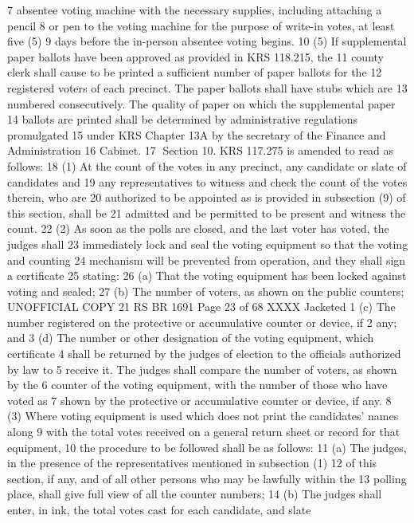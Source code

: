 7 absentee voting machine with the necessary supplies, including attaching a pencil
8 or pen to the voting machine for the purpose of write-in votes, at least five (5)
9 days before the in-person absentee voting begins.
10 (5) If supplemental paper ballots have been approved as provided in KRS 118.215, the
11 county clerk shall cause to be printed a sufficient number of paper ballots for the
12 registered voters of each precinct. The paper ballots shall have stubs which are
13 numbered consecutively. The quality of paper on which the supplemental paper
14 ballots are printed shall be determined by administrative regulations promulgated
15 under KRS Chapter 13A by the secretary of the Finance and Administration
16 Cabinet.
17 Section 10. KRS 117.275 is amended to read as follows:
18 (1) At the count of the votes in any precinct, any candidate or slate of candidates and
19 any representatives to witness and check the count of the votes therein, who are
20 authorized to be appointed as is provided in subsection (9) of this section, shall be
21 admitted and be permitted to be present and witness the count.
22 (2) As soon as the polls are closed, and the last voter has voted, the judges shall
23 immediately lock and seal the voting equipment so that the voting and counting
24 mechanism will be prevented from operation, and they shall sign a certificate
25 stating:
26 (a) That the voting equipment has been locked against voting and sealed;
27 (b) The number of voters, as shown on the public counters;
UNOFFICIAL COPY 21 RS BR 1691
Page 23 of 68
XXXX Jacketed
1 (c) The number registered on the protective or accumulative counter or device, if
2 any; and
3 (d) The number or other designation of the voting equipment, which certificate
4 shall be returned by the judges of election to the officials authorized by law to
5 receive it. The judges shall compare the number of voters, as shown by the
6 counter of the voting equipment, with the number of those who have voted as
7 shown by the protective or accumulative counter or device, if any.
8 (3) Where voting equipment is used which does not print the candidates' names along
9 with the total votes received on a general return sheet or record for that equipment,
10 the procedure to be followed shall be as follows:
11 (a) The judges, in the presence of the representatives mentioned in subsection (1)
12 of this section, if any, and of all other persons who may be lawfully within the
13 polling place, shall give full view of all the counter numbers;
14 (b) The judges shall enter, in ink, the total votes cast for each candidate, and slate
